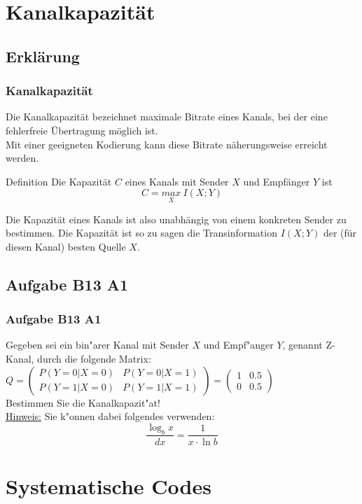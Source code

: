 




\section{Kanalkapazität}
\subsection{Erklärung}
\begin{frame}
	\frametitle{Kanalkapazität}
	Die Kanalkapazität bezeichnet maximale Bitrate eines Kanals, bei der eine fehlerfreie Übertragung möglich ist.\\
	Mit einer geeigneten Kodierung kann diese Bitrate näherungsweise erreicht werden.
	\begin{block}{Definition}
	Die Kapazität $C$ eines Kanals mit Sender $X$ und Empfänger $Y$ ist
	\begin{equation}
		C = \underset{X}{max}\ I(X;Y)
	\end{equation}
	\end{block}
	Die Kapazität eines Kanals ist also unabhängig von einem konkreten Sender zu bestimmen. Die Kapazität ist so zu sagen die Transinformation $I(X;Y)$ der (für diesen Kanal) besten Quelle $X$.
\end{frame}
\subsection{Aufgabe B13 A1}
\begin{frame}
\frametitle{Aufgabe B13 A1}
Gegeben sei ein bin"arer Kanal mit Sender $X$ und Empf"anger $Y$, genannt Z-Kanal,
durch die folgende Matrix:\\[4pt]
$Q = \left( \begin{array}{cc}
P(Y=0|X=0) & P(Y=0|X=1) \\ P(Y=1|X=0) & P(Y=1|X=1)
\end{array} \right) = \left( \begin{array}{cc}
1 & 0.5 \\ 0 & 0.5
\end{array} \right)$\\[4pt]
Bestimmen Sie die Kanalkapazit"at!\\[4pt]
\underline{Hinweis:} Sie k"onnen dabei folgendes verwenden:
\[ \frac{\log_b{x}}{dx} = \frac{1}{x \cdot \ln{b}} \]
\end{frame}


\section{Systematische Codes}

